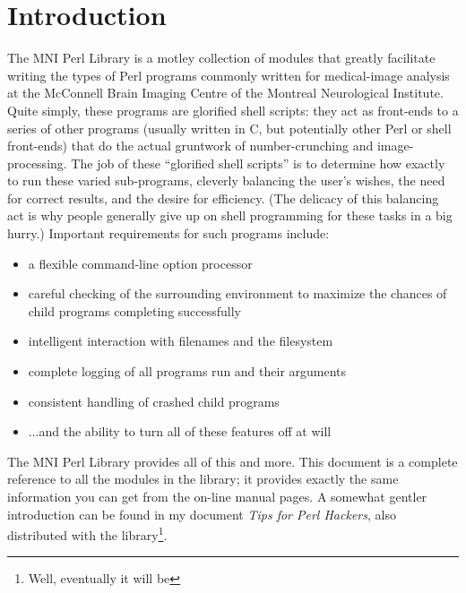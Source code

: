 \documentclass{article}
\begin{document}
\thispagestyle{empty}
\maketitle
\tableofcontents

\section{Introduction}

The MNI Perl Library is a motley collection of modules that greatly
facilitate writing the types of Perl programs commonly written for
medical-image analysis at the McConnell Brain Imaging Centre of the
Montreal Neurological Institute.  Quite simply, these programs are
glorified shell scripts: they act as front-ends to a series of other
programs (usually written in C, but potentially other Perl or shell
front-ends) that do the actual gruntwork of number-crunching and
image-processing.  The job of these ``glorified shell scripts'' is to
determine how exactly to run these varied sub-programs, cleverly
balancing the user's wishes, the need for correct results, and the
desire for efficiency.  (The delicacy of this balancing act is why
people generally give up on shell programming for these tasks in a big
hurry.)  Important requirements for such programs include:

\begin{itemize}
\item a flexible command-line option processor
\item careful checking of the surrounding environment to maximize the
  chances of child programs completing successfully
\item intelligent interaction with filenames and the filesystem
\item complete logging of all programs run and their arguments
\item consistent handling of crashed child programs
\item $\ldots$and the ability to turn all of these features off at will
\end{itemize}

The MNI Perl Library provides all of this and more.  This document is a
complete reference to all the modules in the library; it provides
exactly the same information you can get from the on-line manual pages.
A somewhat gentler introduction can be found in my document \emph{Tips
  for Perl Hackers}, also distributed with the library\footnote{Well,
  eventually it will be}.


\end{document}
